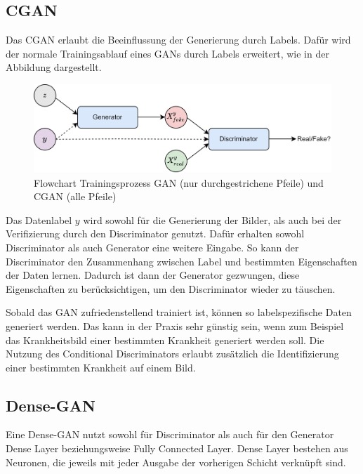 \subsection{CGAN}
Das \acrfull{CGAN} \cite{mirza2014conditional, gan-conditional} erlaubt die Beeinflussung der Generierung durch Labels.
Dafür wird der normale Trainingsablauf eines GANs durch Labels erweitert, wie in der Abbildung dargestellt.
\begin{figure}[H]
	\centering
	\includegraphics[width=14cm]{kapitel/2_stand_der_technik/img/cgan-vs-gan.drawio.png}
	\caption[Flowchart Trainingsprozess GAN und CGAN]{Flowchart Trainingsprozess GAN (nur durchgestrichene Pfeile) und CGAN (alle Pfeile)}
	\label{flowchart-cgan-vs-gan}
\end{figure}

Das Datenlabel $y$ wird sowohl für die Generierung der Bilder, als auch bei der Verifizierung durch den Discriminator genutzt.
Dafür erhalten sowohl Discriminator als auch Generator eine weitere Eingabe.
So kann der Discriminator den Zusammenhang zwischen Label und bestimmten Eigenschaften der Daten lernen.
Dadurch ist dann der Generator gezwungen, diese Eigenschaften zu berücksichtigen, um den Discriminator wieder zu täuschen.
\newline

Sobald das \acrshort{GAN} zufriedenstellend trainiert ist, können so labelspezifische Daten generiert werden.
Das kann in der Praxis sehr günstig sein, wenn zum Beispiel das Krankheitsbild einer bestimmten Krankheit generiert werden soll.
Die Nutzung des Conditional Discriminators erlaubt zusätzlich die Identifizierung einer bestimmten Krankheit auf einem Bild.

\subsection{Dense-GAN}
Eine Dense-GAN nutzt sowohl für Discriminator als auch für den Generator Dense Layer beziehungsweise Fully Connected Layer.
Dense Layer bestehen aus Neuronen, die jeweils mit jeder Ausgabe der vorherigen Schicht verknüpft sind.
\newline

